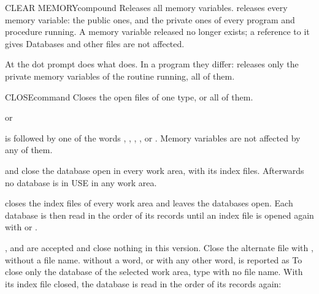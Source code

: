\begin{XbaseEntry}{CLEAR MEMORY}{compound}%
Releases all memory variables.
\Syntax
{}
\Usage
{} releases every memory variable: the public ones, and the
private ones of every program and procedure running.  A memory variable
released no longer exists; a reference to it gives
  Databases and other files are not affected.

At the dot prompt  does what  does.  In a
program they differ:  releases only the private memory
variables of the routine running,  all of them.
\Examples
{}
\end{XbaseEntry}

\begin{XbaseEntry}{CLOSE}{command}
Closes the open files of one type, or all of them.
\Syntax
{}
\par or\par
{}
\Usage
{} is followed by one of the words , ,
, ,  or .  Memory variables
are not affected by any of them.

 and  close the database open in every
work area, with its index files.  Afterwards no database is in USE in any
work area.

 closes the index files of every work area and leaves the
databases open.  Each database is then read in the order of its records
until an index file is opened again with  or .

,  and  are
accepted and close nothing in this version.  Close the alternate file with
, without a file name.   without a word, or with any other word,
is reported as 
\Tips
To close only the database of the selected work area, type  with no
file name.
\Examples
{}
With its index file closed, the database is read in the order of its
records again:
\end{XbaseEntry}

